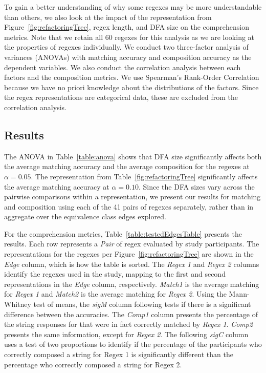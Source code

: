 To gain a better understanding of why some regexes may be more understandable than others, we also look at the impact of the representation from Figure~\ref{fig:refactoringTree}, regex  length, and DFA size on the comprehension metrics. 
Note that  we retain all 60 regexes for this analysis as we are looking at the properties of regexes individually. 
We conduct  two three-factor analysis of variances (ANOVAs) with matching accuracy and composition accuracy as the dependent variables.
We also conduct the correlation analysis between each factors and the composition metrics. 
We use Spearman's Rank-Order Correlation because we have no priori knowledge about the distributions of the factors. 
Since  the regex representations are categorical data, these are excluded from the correlation analysis. 



\subsection{Results}
The ANOVA in Table~\ref{table:anova} shows that DFA size significantly affects both the average matching accuracy and the average composition for the regexes at $\alpha = 0.05$.
The representation from Table~\ref{fig:refactoringTree} significantly affects the average matching accuracy at $\alpha = 0.10$. 
Since the DFA sizes vary across the pairwise comparisons within a representation, we present our results for  matching and composition  using each of the 41 pairs of regexes separately, rather than in aggregate over  the equivalence class edges explored. %




For the comprehension metrics, Table~\ref{table:testedEdgesTable} presents the results.
Each row represents a {\em Pair} of regex evaluated by study participants.
The representations for the regexes per Figure~\ref{fig:refactoringTree} are shown in the {\em Edge} column, which is how the table is sorted. 
The {\em Regex 1} and {\em Regex 2} columns identify the regexes used in the study, mapping to the first and second representations in the {\em Edge} column, respectively. 
{\em Match1} is the average matching for {\em Regex 1} and {\em Match2} is the average matching for {\em Regex 2}. 
Using the Mann-Whitney test of means, the {\em sigM} column following tests if there is a significant difference between the accuracies. 
The {\em Comp1} column presents the percentage of the string responses for that were in fact correctly matched by {\em Regex 1}. {\em Comp2} presents the same information, except for {\em Regex 2}. 
The following {\em sigC} column uses a test of two proportions to identify if the percentage of the participants who correctly composed a string for Regex 1 is significantly different than the percentage who correctly composed a string for {Regex 2}. 



